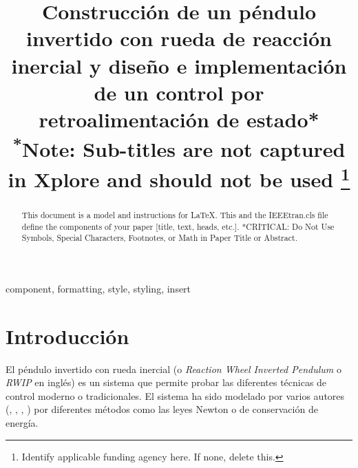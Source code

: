 \documentclass[conference]{IEEEtran}
\begin{document}
\title{Construcción de un péndulo invertido con rueda de reacción inercial y diseño e  implementación de un control por retroalimentación de estado*\\
{\footnotesize \textsuperscript{*}Note: Sub-titles are not captured in Xplore and
should not be used}
\thanks{Identify applicable funding agency here. If none, delete this.}
}

\author{
\and
{}
}

\maketitle

\begin{abstract}
This document is a model and instructions for \LaTeX.
This and the IEEEtran.cls file define the components of your paper [title, text, heads, etc.]. *CRITICAL: Do Not Use Symbols, Special Characters, Footnotes, 
or Math in Paper Title or Abstract.
\end{abstract}

\begin{IEEEkeywords}
component, formatting, style, styling, insert
\end{IEEEkeywords}

\section{Introducción}
El péndulo invertido con rueda inercial (o \textit{Reaction Wheel Inverted Pendulum}  o \textit{RWIP} en inglés) es un sistema que permite probar las diferentes técnicas de control moderno o tradicionales. El sistema ha sido modelado por varios autores (\cite{ref1}, \cite{ref2}, \cite{ref3}, \cite{ref4} ) por diferentes métodos como las leyes Newton o de conservación de energía.
\end{document}
